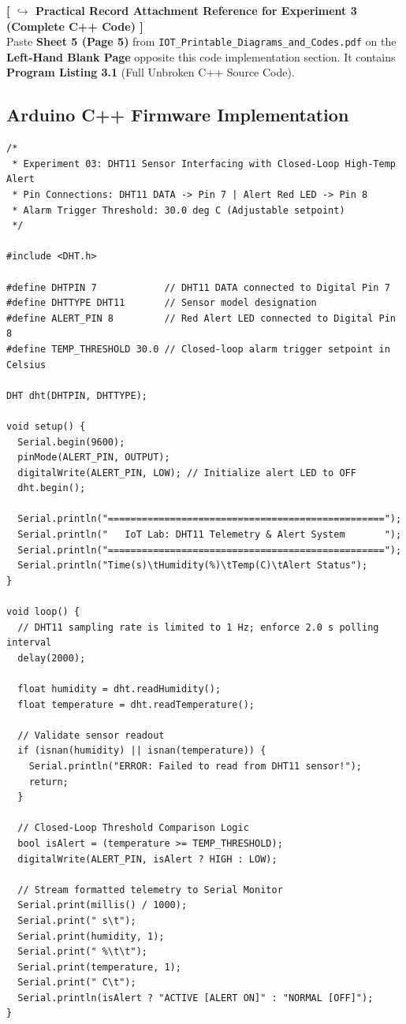 \documentclass[11pt,a4paper]{article}
\begin{document}
\begin{attachmentbox}
\footnotesize
\textbf{[ $\hookrightarrow$ Practical Record Attachment Reference for Experiment 3 (Complete C++ Code) ]}\\
Paste \textbf{Sheet 5 (Page 5)} from \texttt{IOT\_Printable\_Diagrams\_and\_Codes.pdf} on the \textbf{Left-Hand Blank Page} opposite this code implementation section. It contains \textbf{Program Listing 3.1} (Full Unbroken C++ Source Code).
\end{attachmentbox}

\subsection{Arduino C++ Firmware Implementation}
\begin{lstlisting}[style=bwArduino, caption={Arduino C++ Program for DHT11 Telemetry and Closed-Loop Alert Actuation.}]
/*
 * Experiment 03: DHT11 Sensor Interfacing with Closed-Loop High-Temp Alert
 * Pin Connections: DHT11 DATA -> Pin 7 | Alert Red LED -> Pin 8
 * Alarm Trigger Threshold: 30.0 deg C (Adjustable setpoint)
 */

#include <DHT.h>

#define DHTPIN 7            // DHT11 DATA connected to Digital Pin 7
#define DHTTYPE DHT11       // Sensor model designation
#define ALERT_PIN 8         // Red Alert LED connected to Digital Pin 8
#define TEMP_THRESHOLD 30.0 // Closed-loop alarm trigger setpoint in Celsius

DHT dht(DHTPIN, DHTTYPE);

void setup() {
  Serial.begin(9600);
  pinMode(ALERT_PIN, OUTPUT);
  digitalWrite(ALERT_PIN, LOW); // Initialize alert LED to OFF
  dht.begin();
  
  Serial.println("=================================================");
  Serial.println("   IoT Lab: DHT11 Telemetry & Alert System       ");
  Serial.println("=================================================");
  Serial.println("Time(s)\tHumidity(%)\tTemp(C)\tAlert Status");
}

void loop() {
  // DHT11 sampling rate is limited to 1 Hz; enforce 2.0 s polling interval
  delay(2000);

  float humidity = dht.readHumidity();
  float temperature = dht.readTemperature();

  // Validate sensor readout
  if (isnan(humidity) || isnan(temperature)) {
    Serial.println("ERROR: Failed to read from DHT11 sensor!");
    return;
  }

  // Closed-Loop Threshold Comparison Logic
  bool isAlert = (temperature >= TEMP_THRESHOLD);
  digitalWrite(ALERT_PIN, isAlert ? HIGH : LOW);

  // Stream formatted telemetry to Serial Monitor
  Serial.print(millis() / 1000);
  Serial.print(" s\t");
  Serial.print(humidity, 1);
  Serial.print(" %\t\t");
  Serial.print(temperature, 1);
  Serial.print(" C\t");
  Serial.println(isAlert ? "ACTIVE [ALERT ON]" : "NORMAL [OFF]");
}
\end{lstlisting}
\end{document}
